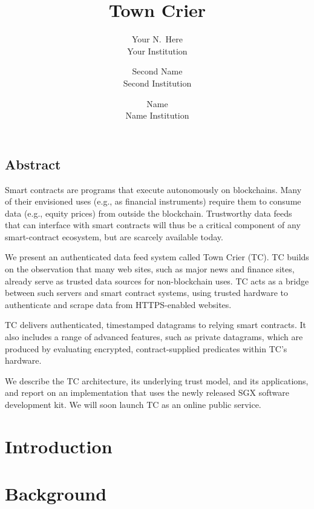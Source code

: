 \documentclass[letterpaper,twocolumn,10pt]{article}
\date{}
\title{\Large \bf Town Crier}
\author{
{\rm Your N.\ Here}\\
Your Institution
\and
{\rm Second Name}\\
Second Institution
\and
{\rm Name}\\
Name Institution
} %
\begin{document}
\maketitle


\subsection*{Abstract}
Smart contracts are programs that execute autonomously on blockchains. Many of their envisioned uses (e.g., as financial instruments) require them to consume data (e.g., equity prices) from outside the blockchain. Trustworthy data feeds that can interface with smart contracts will thus be a critical component of any smart-contract ecosystem, but are scarcely available today.

	We present an authenticated data feed system called Town Crier (TC). TC builds on the observation that many web sites, such as major news and finance sites, already serve as trusted data sources for non-blockchain uses. TC acts as a bridge between such servers and smart contract systems, using trusted hardware to authenticate and scrape data from HTTPS-enabled websites. 
	
	TC delivers authenticated, timestamped datagrams to relying smart contracts. It also includes a range of advanced features, such as private datagrams, which are produced by evaluating encrypted, contract-supplied predicates within TC's hardware.
	
	
	We describe the TC architecture, its underlying trust model, and its applications, and report on an implementation that uses the newly released SGX software development kit. We will soon launch TC as an online public service.
	
\section{Introduction}

\section{Background}
\end{document}
